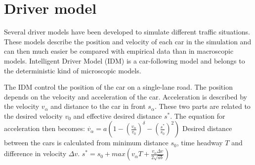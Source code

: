 \section{Driver model}
Several driver models have been developed to simulate different traffic situations. These models describe the position and velocity of each car in the simulation and can then much easier be compared with empirical data than in macroscopic models. Intelligent Driver Model (IDM) is a car-following model and belongs to the deterministic kind of microscopic models.

The IDM control the position of the car on a single-lane road. The position depends on the velocity and acceleration of the car. Acceleration is described by the velocity \begin{math}v_\alpha\end{math} and distance to the car in front \begin{math}s_\alpha\end{math}. These two parts are related to the desired velocity \begin{math}v_0\end{math} and effective desired distance \begin{math}s^\ast\end{math}. The equation for acceleration then becomes:
\begin{math}\dot{v_\alpha} = a(1-(\frac{v_\alpha}{v_0})^\delta-(\frac{s^\ast}{s_0})^2)\end{math}
Desired distance between the cars is calculated from minimum distance \begin{math}s_0\end{math}, time headway \begin{math}T\end{math} and difference in velocity \begin{math}\Delta v\end{math}.
\begin{math}s^\ast = s_0 + max(v_\alpha T + \frac{v_\alpha \Delta v}{2\sqrt{ab}})\end{math}